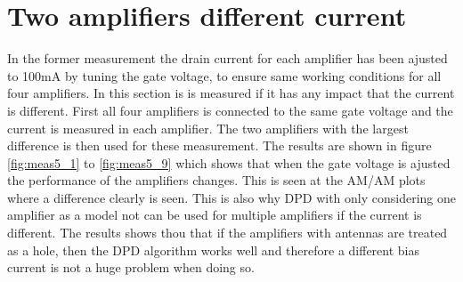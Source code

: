 

\section{Two amplifiers different current}
In the former measurement the drain current for each amplifier has been ajusted to 100mA by tuning the gate voltage, to ensure same working conditions for all four amplifiers. In this section is is measured if it has any impact that the current is different. First all four amplifiers is connected to the same gate voltage and the current is measured in each amplifier. The two amplifiers with the largest difference is then used for these measurement. The results are shown in figure \ref{fig:meas5_1} to \ref{fig:meas5_9} which shows that when the gate voltage is ajusted the performance of the amplifiers changes. This is seen at the AM/AM plots where a difference clearly is seen. This is also why DPD with only considering one amplifier as a model not can be used for multiple amplifiers if the current is different. The results shows thou that if the amplifiers with antennas are treated as a hole, then the DPD algorithm works well and therefore a different bias current is not a huge problem when doing so.


